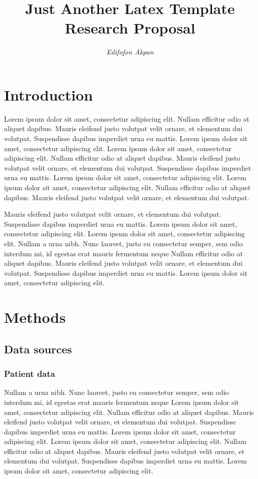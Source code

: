 \documentclass[12pt]{article}
\title{\LARGE \bfseries \vspace{-1cm} Just Another Latex Template \\
    \LARGE \normalfont Research Proposal}
\author{\Large \textit{Edifofon Akpan}}
\date{ }
\begin{document}
\fontsize{13pt}{15pt}\selectfont

\maketitle


\section{Introduction}
Lorem ipsum dolor sit amet, consectetur adipiscing elit. Nullam efficitur odio at aliquet dapibus. Mauris eleifend justo volutpat velit ornare, et elementum dui volutpat. Suspendisse dapibus imperdiet urna eu mattis. Lorem ipsum dolor sit amet, consectetur adipiscing elit. Lorem ipsum dolor sit amet, consectetur adipiscing elit. Nullam efficitur odio at aliquet dapibus. Mauris eleifend justo volutpat velit ornare, et elementum dui volutpat. Suspendisse dapibus imperdiet urna eu mattis. Lorem ipsum dolor sit amet, consectetur adipiscing elit. Lorem ipsum dolor sit amet, consectetur adipiscing elit. Nullam efficitur odio at aliquet dapibus. Mauris eleifend justo volutpat velit ornare, et elementum dui volutpat. 

Mauris eleifend justo volutpat velit ornare, et elementum dui volutpat. Suspendisse dapibus imperdiet urna eu mattis. Lorem ipsum dolor sit amet, consectetur adipiscing elit. Lorem ipsum dolor sit amet, consectetur adipiscing elit. Nullam a urna nibh. Nunc laoreet, justo eu consectetur semper, sem odio interdum mi, id egestas erat mauris fermentum neque Nullam efficitur odio at aliquet dapibus. Mauris eleifend justo volutpat velit ornare, et elementum dui volutpat. Suspendisse dapibus imperdiet urna eu mattis. Lorem ipsum dolor sit amet, consectetur adipiscing elit. 

\section{Methods}
\subsection{Data sources}
\subsubsection{Patient data}
Nullam a urna nibh. Nunc laoreet, justo eu consectetur semper, sem odio interdum mi, id egestas erat mauris fermentum neque Lorem ipsum dolor sit amet, consectetur adipiscing elit. Nullam efficitur odio at aliquet dapibus. Mauris eleifend justo volutpat velit ornare, et elementum dui volutpat. Suspendisse dapibus imperdiet urna eu mattis. Lorem ipsum dolor sit amet, consectetur adipiscing elit. Lorem ipsum dolor sit amet, consectetur adipiscing elit. Nullam efficitur odio at aliquet dapibus. Mauris eleifend justo volutpat velit ornare, et elementum dui volutpat. Suspendisse dapibus imperdiet urna eu mattis. Lorem ipsum dolor sit amet, consectetur adipiscing elit. 
\end{document}
